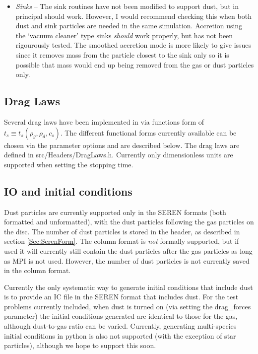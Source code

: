 \documentclass[a4paper]{article}
\begin{document}
\begin{itemize}
\item \emph{Sinks} -- The sink routines have not been modified to support dust, but in principal should work. However, I would recommend checking this when both dust and sink particles are needed in the same simulation. Accretion using  the `vacuum cleaner' type sinks \emph{should} work properly, but has not been rigourously tested. The smoothed accretion mode is more likely to give issues since it removes mass from the particle closest to the sink only so it is possible that mass would end up being removed from the gas or dust particles only.

\end{itemize}

\subsection{Drag Laws}
Several drag laws have been implemented in via functions form of $t_s \equiv t_s (\rho_g , \rho_d , c_s)$. The different functional forms currently available can be chosen via the parameter options and are described below. The drag laws are defined in src/Headers/DragLaws.h. Currently only dimensionless units are supported when setting the stopping time.

\subsection{IO and initial conditions}
Dust particles are currently supported only in the SEREN formats (both formatted and unformatted), with the dust particles following the gas particles on the disc. The number of dust particles is stored in the header, as described in section \ref{Sec:SerenForm}. The column format is \emph{not} formally supported, but if used it will currently still contain the dust particles after the gas particles as long as MPI is not used. However, the number of dust particles is not currently saved in the column format.

Currently the only systematic way to generate initial conditions that include dust is to provide an IC file in the SEREN format that includes dust. For the test problems currently included, when dust is turned  on (via setting the drag\_forces parameter) the initial conditions generated are identical to those for the gas, although dust-to-gas ratio can be varied. Currently, generating multi-species initial conditions in python is also not supported (with the exception of star particles), although we hope to support this soon.
\end{document}
